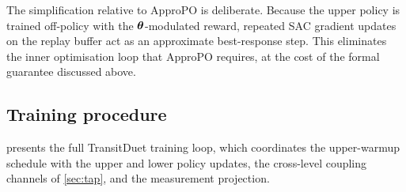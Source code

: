 The simplification relative to ApproPO is deliberate. Because the upper policy is trained off-policy with the $\boldsymbol{\theta}$-modulated reward, repeated SAC gradient updates on the replay buffer act as an approximate best-response step. This eliminates the inner optimisation loop that ApproPO requires, at the cost of the formal guarantee discussed above.

\subsection{Training procedure}
\label{sec:training}

 presents the full TransitDuet training loop, which coordinates the upper-warmup schedule with the upper and lower policy updates, the cross-level coupling channels of \cref{sec:tap}, and the measurement projection.

